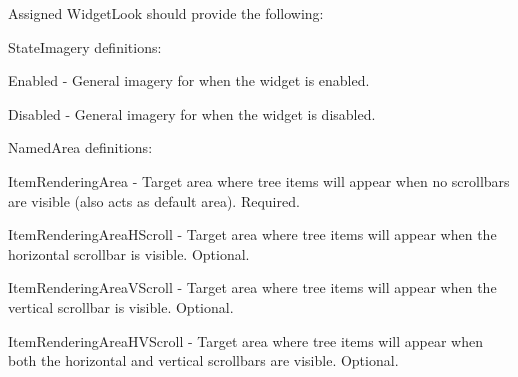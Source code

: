 Assigned Widget\+Look should provide the following\+: 
\begin{DoxyItemize}
\item State\+Imagery definitions\+: 
\begin{DoxyItemize}
\item Enabled -\/ General imagery for when the widget is enabled. 
\item Disabled -\/ General imagery for when the widget is disabled. 
\end{DoxyItemize}


\item Named\+Area definitions\+: 
\begin{DoxyItemize}
\item Item\+Rendering\+Area -\/ Target area where tree items will appear when no scrollbars are visible (also acts as default area). Required. 
\item Item\+Rendering\+Area\+H\+Scroll -\/ Target area where tree items will appear when the horizontal scrollbar is visible. Optional. 
\item Item\+Rendering\+Area\+V\+Scroll -\/ Target area where tree items will appear when the vertical scrollbar is visible. Optional. 
\item Item\+Rendering\+Area\+H\+V\+Scroll -\/ Target area where tree items will appear when both the horizontal and vertical scrollbars are visible. Optional. 
\end{DoxyItemize}
\end{DoxyItemize}